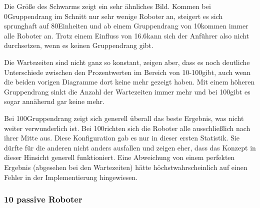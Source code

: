 Die Größe des Schwarms zeigt ein sehr ähnliches Bild. Kommen bei 0\per Gruppendrang im Schnitt nur sehr wenige Roboter an, steigert es sich sprunghaft auf 80\per Einheiten und ab einem Gruppendrang von 10\per kommen immer alle Roboter an. Trotz einem Einfluss von 16.6\per kann sich der Anführer also nicht durchsetzen, wenn es keinen Gruppendrang gibt.

Die Wartezeiten sind nicht ganz so konstant, zeigen aber, dass es noch deutliche Unterschiede zwischen den Prozentwerten im Bereich von 10-100\per gibt, auch wenn die beiden vorigen Diagramme dort keine mehr gezeigt haben. Mit einem höheren Gruppendrang sinkt die Anzahl der Wartezeiten immer mehr und bei 100\per gibt es sogar annähernd gar keine mehr.

Bei 100\per Gruppendrang zeigt sich generell überall das beste Ergebnis, was nicht weiter verwunderlich ist. Bei 100\per richten sich die Roboter alle ausschließlich nach ihrer Mitte aus. Diese Konfiguration gab es nur in dieser ersten Statistik. Sie dürfte für die anderen nicht anders ausfallen und zeigen eher, dass das Konzept in dieser Hinsicht generell funktioniert. Eine Abweichung von einem perfekten Ergebnis (abgesehen bei den Wartezeiten) hätte höchstwahrscheinlich auf einen Fehler in der Implementierung hingewiesen.

\subsubsection*{10 passive Roboter}

